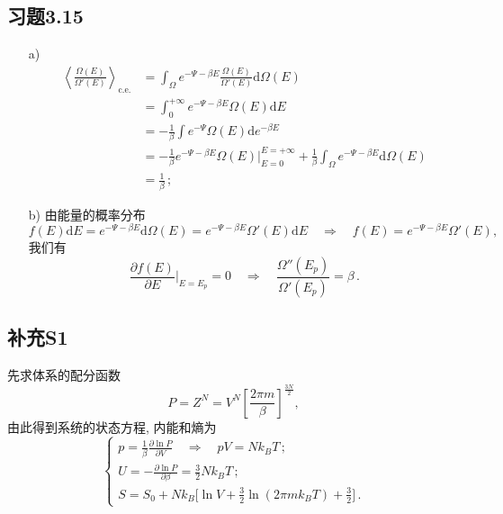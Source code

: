 \documentclass[letterpaper, 10pt]{article}
\newcommand{\dd}{\mathrm{d}}
\begin{document}
\subsection{习题3.15}
\begin{itemize}
	\item[a)]
	\begin{align*}
	\left\langle \frac{\Omega(E)}{\Omega'(E)} \right\rangle_{\text{c.e.}} & = \int_{\Omega} e^{-\Psi - \beta E} \frac{\Omega(E)}{\Omega'(E)} \dd \Omega(E) \\
	& = \int_{0}^{+\infty} e^{-\Psi -\beta E} \Omega(E) \dd E \\
	& = - \frac{1}{\beta} \int e^{-\Psi} \Omega(E) \dd e^{-\beta E} \\
	& = - \frac{1}{\beta} e^{-\Psi - \beta E} \Omega(E) \bigg|_{E=0}^{E=+\infty} + \frac{1}{\beta} \int_{\Omega} e^{-\Psi - \beta E} \dd \Omega(E) \\
	& = \frac{1}{\beta}\,;
	\end{align*}
	\item[b)]
	由能量的概率分布
	\[ f(E) \dd E = e^{-\Psi - \beta E} \dd \Omega(E) = e^{-\Psi - \beta E} \Omega'(E) \dd E \quad{} \Rightarrow \quad{} f(E) = e^{-\Psi - \beta E} \Omega'(E), \]
	我们有
	\[ \frac{\partial f(E)}{\partial E} \bigg|_{E=E_{p}} = 0 \quad{} \Rightarrow \quad{} \frac{\Omega''(E_{p})}{\Omega'(E_{p})} = \beta\,. \]
\end{itemize}

\subsection{补充S1}
先求体系的配分函数
\[ P = Z^{N} = V^{N} \left[ \frac{2\pi m}{\beta} \right]^{\frac{3N}{2}},  \]
由此得到系统的状态方程, 内能和熵为
\[\begin{cases}
p = \frac{1}{\beta} \frac{\partial \ln P}{\partial V} \quad{} \Rightarrow \quad{} pV = Nk_{B}T\,;\\
U = - \frac{\partial \ln P}{\partial \beta} = \frac{3}{2}Nk_{B}T\,;\\
S = S_{0} + Nk_{B} \big[ \ln V + \frac{3}{2} \ln (2\pi m k_{B} T) + \frac{3}{2} \big]\,.
\end{cases}\]
\end{document}
